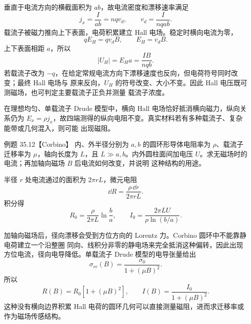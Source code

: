 \begin{xesolution}
垂直于电流方向的横截面积为 $ab$，故电流密度和漂移速率满足
\begin{equation}
  j_x=\frac{I}{ab}=nqv_d,
  \qquad v_d=\frac{I}{nqab}.
\end{equation}
载流子被磁力推向上下表面，电荷积累建立 Hall 电场。稳定时横向电流为零，
\[
  qE_H=qv_dB,
  \qquad E_H=v_dB.
\]
上下表面相距 $a$，所以
\begin{equation}
  \boxed{|U_H|=E_Ha=\frac{IB}{nqb}}.
\end{equation}
若载流子改为 $-q$，在给定常规电流方向下漂移速度也反向，但电荷符号同时改变；最终 Hall 电场与
原来反向，$U_H$ 的符号改变、大小不变。因此 Hall 电压既可测磁场，也可判定主要载流子正负并测量
载流子浓度。

在理想均匀、单载流子 Drude 模型中，横向 Hall 电场恰好抵消横向磁力，纵向关系仍为
$E_x=\rho j_x$，故四端测得的纵向电阻不变。真实材料若有多种载流子、复杂能带或几何混入，则可能
出现磁阻。

\hallDiagram
\end{xesolution}

\Needspace{0.46\textheight}
\begin{origexamplebox}{例题 35.12【Corbino】}
内、外半径分别为 $a,b$ 的圆环形导体电阻率为 $\rho$、载流子迁移率为 $\mu$，轴向长度为 $L$，且
$L\gg a,b$。内外圆柱面间加电压 $U$。求无磁场时的电流；再加轴向磁场 $B$ 后电流如何改变，并说明
这种结构的用途。
\end{origexamplebox}

\begin{xesolution}
半径 $r$ 处电流通过的面积为 $2\pi rL$，微元电阻
\[
  \dd R=\frac{\rho\,\dd r}{2\pi rL}.
\]
积分得
\begin{equation}
  R_0=\frac{\rho}{2\pi L}\ln\frac ba,
  \qquad
  \boxed{I_0=\frac{2\pi LU}{\rho\ln(b/a)}}.
\end{equation}

加轴向磁场后，径向漂移会受到方位方向的 Lorentz 力。Corbino 圆环中不能靠静电荷建立一个沿整圈
同向、线积分非零的静电场来完全抵消这种偏转，因此出现方位电流，径向电导降低。单载流子 Drude
模型的电导张量给出
\begin{equation}
  \sigma_{rr}(B)=\frac{\sigma_0}{1+(\mu B)^2}.
\end{equation}
所以
\begin{equation}
  \boxed{R(B)=R_0[1+(\mu B)^2]},
  \qquad
  \boxed{I(B)=\frac{I_0}{1+(\mu B)^2}}.
\end{equation}
这种没有横向边界积累 Hall 电荷的圆环几何可以直接测量磁阻，进而求迁移率或作为磁场传感结构。

\corbinoDiagram
\end{xesolution}


